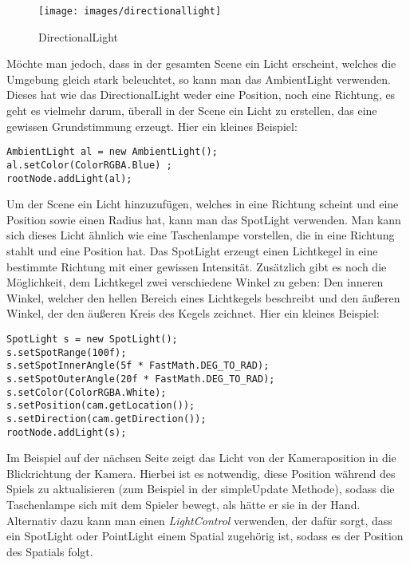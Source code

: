 \begin{figure}[h!]
	
	
	\caption{DirectionalLight}
	
	\centering\texttt{[image: images/directionallight]} 
	
\end{figure}

\newpage

Möchte man jedoch, dass in der gesamten Scene ein Licht erscheint, welches die Umgebung gleich stark beleuchtet, so kann man das AmbientLight verwenden. Dieses hat wie das DirectionalLight weder eine Position, noch eine Richtung, es geht es vielmehr darum, überall in der Scene ein Licht zu erstellen, das eine gewissen Grundstimmung erzeugt. Hier ein kleines Beispiel:

\begin{lstlisting}
AmbientLight al = new AmbientLight();
al.setColor(ColorRGBA.Blue) ;
rootNode.addLight(al);
\end{lstlisting}

Um der Scene ein Licht hinzuzufügen, welches in eine Richtung scheint und eine Position sowie einen Radius hat, kann man das SpotLight verwenden. Man kann sich dieses Licht ähnlich wie eine Taschenlampe vorstellen, die in eine Richtung stahlt und eine Position hat. Das SpotLight erzeugt einen Lichtkegel in eine bestimmte Richtung mit einer gewissen Intensität. Zusätzlich gibt es noch die Möglichkeit, dem Lichtkegel zwei verschiedene Winkel zu geben: Den inneren Winkel, welcher den hellen Bereich eines Lichtkegels beschreibt und den äußeren Winkel, der den äußeren Kreis des Kegels zeichnet. Hier ein kleines Beispiel:
\begin{lstlisting}
SpotLight s = new SpotLight();
s.setSpotRange(100f);                           
s.setSpotInnerAngle(5f * FastMath.DEG_TO_RAD); 
s.setSpotOuterAngle(20f * FastMath.DEG_TO_RAD); 
s.setColor(ColorRGBA.White); 
s.setPosition(cam.getLocation());         
s.setDirection(cam.getDirection());     
rootNode.addLight(s);
\end{lstlisting}

Im Beispiel auf der nächsen Seite zeigt das Licht von der Kameraposition in die Blickrichtung der Kamera. Hierbei ist es notwendig, diese Position während des Spiels zu aktualisieren (zum Beispiel in der simpleUpdate Methode), sodass die Taschenlampe sich mit dem Spieler bewegt, als hätte er sie in der Hand. Alternativ dazu kann man einen \emph{LightControl} verwenden, der dafür sorgt, dass ein SpotLight oder PointLight einem Spatial zugehörig ist, sodass es der Position des Spatials folgt. \pagebreak

